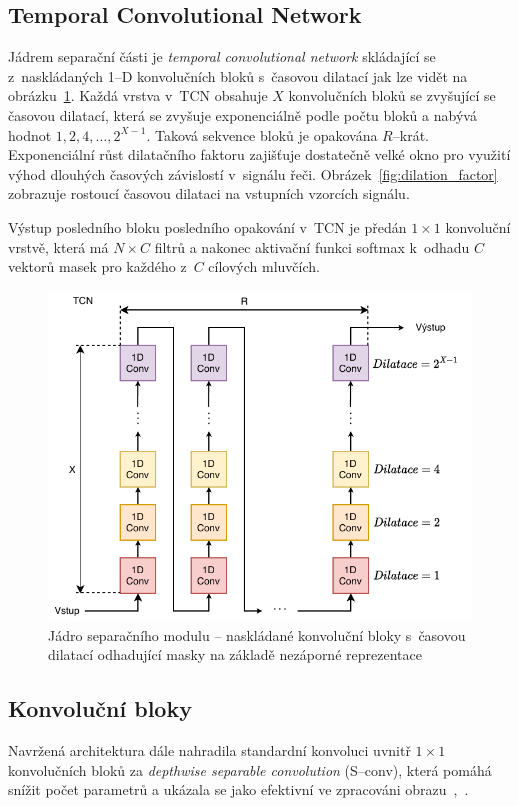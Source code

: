 \subsection{Temporal Convolutional Network}
Jádrem separační části je \textit{temporal convolutional network} skládající se z~naskládaných  1--D konvolučních bloků s~časovou dilatací jak lze vidět na obrázku~\ref{fig:tasnet-stacked-resblocks}. Každá vrstva v~TCN obsahuje $X$ konvolučních bloků se zvyšující se časovou dilatací, která se zvyšuje exponenciálně podle počtu bloků a nabývá hodnot $1, 2, 4, \dots, 2^{X-1}$. Taková sekvence bloků je opakována $R$--krát. Exponenciální růst dilatačního faktoru zajišťuje dostatečně velké okno pro využití výhod dlouhých časových závislostí v~signálu řeči. Obrázek~\ref{fig:dilation_factor} zobrazuje rostoucí časovou dilataci na vstupních vzorcích signálu.

Výstup posledního bloku posledního opakování v~TCN je předán $1 \times 1$ konvoluční vrstvě, která má $N \times C$ filtrů a nakonec aktivační funkci softmax k~odhadu $C$ vektorů masek pro každého z~$C$ cílových mluvčích.


\begin{figure}[H]
    \centering
    \includegraphics[scale=0.9]{obrazky-figures/stacked_resblocks.pdf}
    \caption{\label{fig:tasnet-stacked-resblocks}Jádro separačního modulu -- naskládané konvoluční bloky s~časovou dilatací odhadující masky na základě nezáporné reprezentace}
\end{figure}



\subsection{Konvoluční bloky}
Navržená architektura dále nahradila standardní konvoluci uvnitř $1 \times 1$ konvolučních bloků za \textit{depthwise separable convolution} (S--conv), která pomáhá snížit počet parametrů a ukázala se jako efektivní ve zpracováni obrazu~\cite{Chollet_2017_CVPR},~\cite{MobileNets}.

